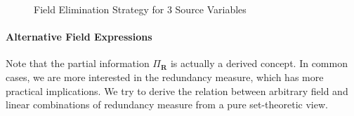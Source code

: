 \begin{figure}
\centering
{}%
\quad
{}%
\quad
{}%
\centering
\caption{Field Elimination Strategy for 3 Source Variables}
\label{fig:elim4}
\end{figure}


\paragraph{Alternative Field Expressions} Note that the partial information $\Pi_{\mathbf{R}}$ is actually a derived concept. In common cases, we are more interested in the redundancy measure, which has more practical implications. We try to derive the relation between arbitrary field and linear combinations of redundancy measure from a pure set-theoretic view.

